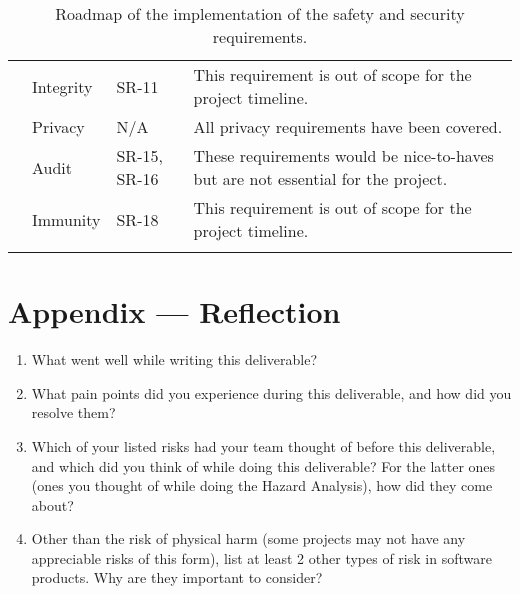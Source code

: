 \documentclass{article}
\begin{document}
\begin{longtable}[c]{|m{2.5cm}|m{2.6cm}|m{2cm}|m{3.6cm}|}
    \cline{2-4}
    & Integrity & SR-11 & This requirement is out of scope for the project timeline.\\
    \cline{2-4}
    & Privacy & N/A & All privacy requirements have been covered.\\
    \cline{2-4}
    & Audit & SR-15, SR-16 & These requirements would be nice-to-haves but are not essential for the project.\\
    \cline{2-4}
    & Immunity & SR-18 & This requirement is out of scope for the project timeline.\\
    \hline
    \caption{Roadmap of the implementation of the safety and security requirements.}
\end{longtable}

\newpage{}

\section*{Appendix --- Reflection}




\begin{enumerate}
    \item What went well while writing this deliverable? 
    \item What pain points did you experience during this deliverable, and how
    did you resolve them?
    \item Which of your listed risks had your team thought of before this
    deliverable, and which did you think of while doing this deliverable? For
    the latter ones (ones you thought of while doing the Hazard Analysis), how
    did they come about?
    \item Other than the risk of physical harm (some projects may not have any
    appreciable risks of this form), list at least 2 other types of risk in
    software products. Why are they important to consider?
\end{enumerate}
\end{document}
